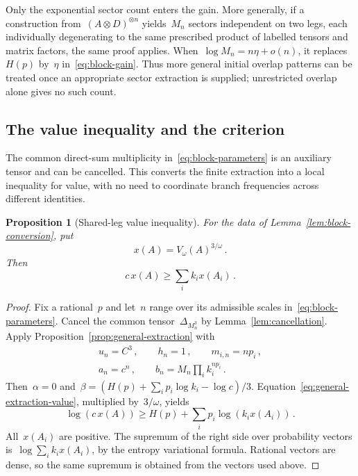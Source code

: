 \documentclass[11pt,letterpaper]{article}
\newtheorem{proposition}[theorem]{Proposition}
\theoremstyle{definition}
\numberwithin{equation}{section}
\begin{document}
Only the exponential sector count enters the gain. More generally, if a construction from~$(A\otimes D)^{\otimes n}$ yields~$M_n$ sectors independent on two legs, each individually degenerating to the same prescribed product of labelled tensors and matrix factors, the same proof applies. When~$\log M_n=n\eta+o(n)$, it replaces~$H(p)$ by~$\eta$ in~\eqref{eq:block-gain}. Thus more general initial overlap patterns can be treated once an appropriate sector extraction is supplied; unrestricted overlap alone gives no such count.

\subsection{The value inequality and the criterion}\label{sec:optimization-proof}

The common direct-sum multiplicity in~\eqref{eq:block-parameters} is an auxiliary tensor and can be cancelled. This converts the finite extraction into a local inequality for value, with no need to coordinate branch frequencies across different identities.

\begin{proposition}[Shared-leg value inequality]\label{prop:local-value}
For the data of Lemma~\ref{lem:block-conversion}, put
\begin{equation}\label{eq:normalized-value}
 x(A)=V_\omega(A)^{3/\omega}\,.
\end{equation}
Then
\begin{equation}\label{eq:local-value}
 c\,x(A)\geq\sum_i k_i x(A_i)\,.
\end{equation}
\end{proposition}
\begin{proof}
Fix a rational~$p$ and let~$n$ range over its admissible scales in~\eqref{eq:block-parameters}. Cancel the common tensor~$\Delta_{M_n^3}$ by Lemma~\ref{lem:cancellation}. Apply Proposition~\ref{prop:general-extraction} with
\begin{equation*}
 \begin{gathered}
 u_n=C^3\,,\qquad h_n=1\,,\qquad m_{i,n}=np_i\,,\\
 a_n=c^n\,,\qquad b_n=M_n\prod_i k_i^{np_i}\,.
 \end{gathered}
\end{equation*}
Then~$\alpha=0$ and~$\beta=(H(p)+\sum_i p_i\log k_i-\log c)/3$. Equation~\eqref{eq:general-extraction-value}, multiplied by~$3/\omega$, yields
\begin{equation*}
 \log(c\,x(A))\geq H(p)+\sum_i p_i\log(k_i x(A_i))\,.
\end{equation*}
All~$x(A_i)$ are positive. The supremum of the right side over probability vectors is~$\log\sum_i k_i x(A_i)$, by the entropy variational formula. Rational vectors are dense, so the same supremum is obtained from the vectors used above.
\end{proof}
\end{document}
